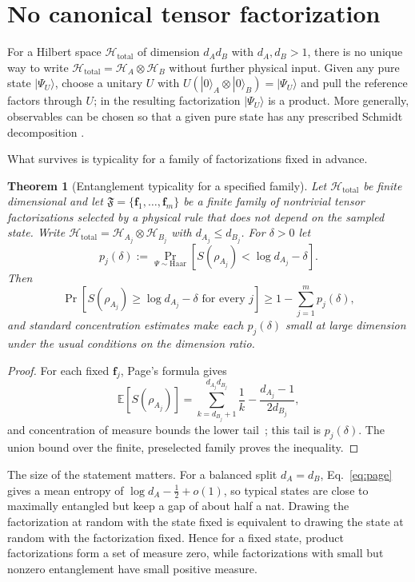 \documentclass[12pt,a4paper]{article}
\newtheorem{theorem}{Theorem}[section]
\begin{document}
\section{No canonical tensor factorization}
\label{sec:nopref}

For a Hilbert space $\mathcal H_{\mathrm{total}}$ of dimension $d_Ad_B$ with $d_A,d_B>1$, there is no unique way to write $\mathcal H_{\mathrm{total}}=\mathcal H_A\otimes\mathcal H_B$ without further physical input. Given any pure state $|\Psi_U\rangle$, choose a unitary $U$ with $U(|0\rangle_A\otimes|0\rangle_B)=|\Psi_U\rangle$ and pull the reference factors through $U$; in the resulting factorization $|\Psi_U\rangle$ is a product. More generally, observables can be chosen so that a given pure state has any prescribed Schmidt decomposition \cite{HarshmanRanade2011}.

What survives is typicality for a family of factorizations fixed in advance.

\begin{theorem}[Entanglement typicality for a specified family]
\label{thm:nofact}
Let $\mathcal H_{\mathrm{total}}$ be finite dimensional and let
$\mathfrak F=\{\mathbf f_1,\ldots,\mathbf f_m\}$ be a finite family of
nontrivial tensor factorizations selected by a physical rule that does not depend on the sampled state.  Write
$\mathcal H_{\mathrm{total}}=\mathcal H_{A_j}\otimes\mathcal H_{B_j}$
with $d_{A_j}\le d_{B_j}$.  For $\delta>0$ let
\[
p_j(\delta):=
\Pr_{\Psi\sim\mathrm{Haar}}
\left[S(\rho_{A_j})<\log d_{A_j}-\delta\right].
\]
Then
\[
\Pr\left[
S(\rho_{A_j})\ge\log d_{A_j}-\delta
\text{ for every }j
\right]
\ge 1-\sum_{j=1}^m p_j(\delta),
\]
and standard concentration estimates make each $p_j(\delta)$ small at large dimension under the usual conditions on the dimension ratio.
\end{theorem}

\begin{proof}
For each fixed $\mathbf f_j$, Page's formula gives~\cite{Page1993}
\begin{equation}
\label{eq:page}
\mathbb{E}[S(\rho_{A_j})]
=\sum_{k=d_{B_j}+1}^{d_{A_j}d_{B_j}}\frac1k
-\frac{d_{A_j}-1}{2d_{B_j}},
\end{equation}
and concentration of measure bounds the lower tail~\cite{HaydenLeungWinter2006}; this tail is $p_j(\delta)$.  The union bound over the finite, preselected family proves the inequality.
\end{proof}

The size of the statement matters. For a balanced split $d_A=d_B$, Eq.~\eqref{eq:page} gives a mean entropy of $\log d_A-\tfrac12+o(1)$, so typical states are close to maximally entangled but keep a gap of about half a nat. Drawing the factorization at random with the state fixed is equivalent to drawing the state at random with the factorization fixed. Hence for a fixed state, product factorizations form a set of measure zero, while factorizations with small but nonzero entanglement have small positive measure.
\end{document}
